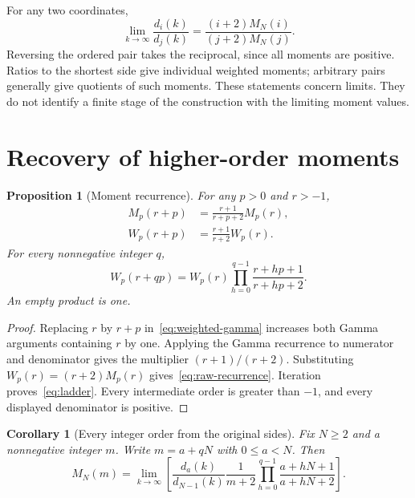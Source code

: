 \documentclass[11pt]{article}
\numberwithin{equation}{section}
\newtheorem{proposition}[theorem]{Proposition}
\newtheorem{corollary}[theorem]{Corollary}
\theoremstyle{remark}
\begin{document}
For any two coordinates,
\begin{equation}
  \lim_{k\to\infty}\frac{d_i(k)}{d_j(k)}
    =\frac{(i+2)M_N(i)}{(j+2)M_N(j)}.
  \label{eq:all-pairs}
\end{equation}
Reversing the ordered pair takes the reciprocal, since all moments
are positive. Ratios to the shortest side give individual weighted
moments; arbitrary pairs generally give quotients of such moments.
These statements concern limits. They do not identify a finite
stage of the construction with the limiting moment values.

\section{Recovery of higher-order moments}
\label{sec:recurrence}

\begin{proposition}[Moment recurrence]
\label{prop:recurrence}
For any $p>0$ and $r>-1$,
\begin{align}
  M_p(r+p)&=\frac{r+1}{r+p+2}M_p(r), \label{eq:raw-recurrence}\\
  W_p(r+p)&=\frac{r+1}{r+2}W_p(r).   \label{eq:weighted-recurrence}
\end{align}
For every nonnegative integer $q$,
\begin{equation}
  W_p(r+qp)=W_p(r)
       \prod_{h=0}^{q-1}\frac{r+hp+1}{r+hp+2}.
  \label{eq:ladder}
\end{equation}
An empty product is one.
\end{proposition}

\begin{proof}
Replacing $r$ by $r+p$ in~\eqref{eq:weighted-gamma} increases both
Gamma arguments containing $r$ by one. Applying the Gamma recurrence
to numerator and denominator gives the multiplier $(r+1)/(r+2)$.
Substituting $W_p(r)=(r+2)M_p(r)$ gives~\eqref{eq:raw-recurrence}.
Iteration proves~\eqref{eq:ladder}. Every intermediate order is greater
than $-1$, and every displayed denominator is positive.
\end{proof}

\begin{corollary}[Every integer order from the original sides]
\label{cor:recovery}
Fix $N\geq2$ and a nonnegative integer $m$.
Write $m=a+qN$ with $0\leq a<N$. Then
\begin{equation}
  M_N(m)=
   \lim_{k\to\infty}
   \left[
     \frac{d_a(k)}{d_{N-1}(k)}
     \frac{1}{m+2}
     \prod_{h=0}^{q-1}\frac{a+hN+1}{a+hN+2}
   \right].
   \label{eq:all-orders}
\end{equation}
\end{corollary}
\end{document}
